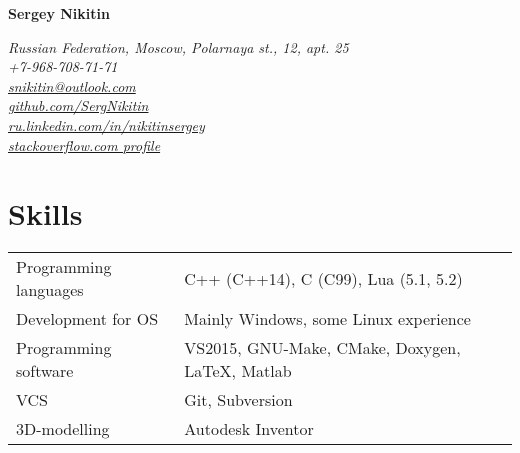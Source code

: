 \documentclass[a4paper, 11pt]{article}
\begin{document}
{\LARGE\textbf{Sergey Nikitin}}

\begin{flushright}
    {\itshape
        Russian Federation, Moscow, Polarnaya st., 12, apt. 25                                  \\
        +7-968-708-71-71                                                                        \\
        \href{mailto:snikitin@outlook.com}{snikitin@outlook.com}                                \\
        \href{https://github.com/SergNikitin}{github.com/SergNikitin}                           \\
        \href{http://ru.linkedin.com/in/nikitinsergey}{ru.linkedin.com/in/nikitinsergey}        \\
        \href{http://stackoverflow.com/users/3375765/sergey-nikitin}{stackoverflow.com profile} \\
    }
\end{flushright}

\section{Skills}
\begin{tabular}{ll}
    Programming languages    & C++ (C++14), C (C99), Lua (5.1, 5.2)            \\
    Development for OS       & Mainly Windows, some Linux experience           \\
    Programming software     & VS2015, GNU-Make, CMake, Doxygen, LaTeX, Matlab \\
    VCS                      & Git, Subversion                                 \\
    3D-modelling             & Autodesk Inventor
\end{tabular}
\end{document}
